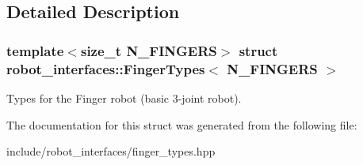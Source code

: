 \subsection{Detailed Description}
\subsubsection*{template$<$size\+\_\+t N\+\_\+\+F\+I\+N\+G\+E\+RS$>$\newline
struct robot\+\_\+interfaces\+::\+Finger\+Types$<$ N\+\_\+\+F\+I\+N\+G\+E\+R\+S $>$}

Types for the Finger robot (basic 3-\/joint robot). 

The documentation for this struct was generated from the following file\+:\begin{DoxyCompactItemize}
\item 
include/robot\+\_\+interfaces/finger\+\_\+types.\+hpp\end{DoxyCompactItemize}
